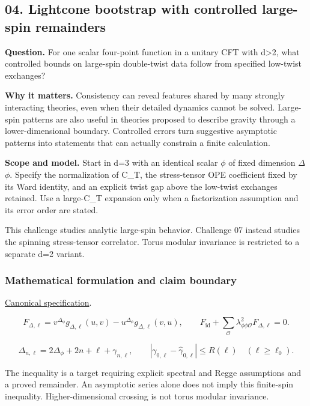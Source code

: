 \documentclass[
  11pt,
]{article}
\begin{document}
\subsection{04. Lightcone bootstrap with controlled large-spin
remainders}

\textbf{Question.} For one scalar four-point function in a unitary CFT
with d\textgreater2, what controlled bounds on large-spin double-twist
data follow from specified low-twist exchanges?

\textbf{Why it matters.} Consistency can reveal features shared by many
strongly interacting theories, even when their detailed dynamics cannot
be solved. Large-spin patterns are also useful in theories proposed to
describe gravity through a lower-dimensional boundary. Controlled errors
turn suggestive asymptotic patterns into statements that can actually
constrain a finite calculation.

\textbf{Scope and model.} Start in d=3 with an identical scalar
\ensuremath{\phi} of fixed dimension
\ensuremath{\Delta}\ensuremath{\phi}. Specify the normalization of C\_T,
the stress-tensor OPE coefficient fixed by its Ward identity, and an
explicit twist gap above the low-twist exchanges retained. Use a
large-C\_T expansion only when a factorization assumption and its error
order are stated.

This challenge studies analytic large-spin behavior. Challenge 07
instead studies the spinning stress-tensor correlator. Torus modular
invariance is restricted to a separate d=2 variant.

\subsubsection{Mathematical formulation and claim boundary}

\href{https://github.com/rick-stevens-ai/Pure-Thought/blob/main/PRDs/04-Modular-Lightcone-Bootstrap.md}{Canonical
specification}.

\[F_{\Delta,\ell}=v^{\Delta_\phi}g_{\Delta,\ell}(u,v)
-u^{\Delta_\phi}g_{\Delta,\ell}(v,u),\qquad
F_{\mathrm{id}}+\sum_{\mathcal O}\lambda_{\phi\phi\mathcal O}^{2}F_{\Delta,\ell}=0.\]

\[\Delta_{n,\ell}=2\Delta_\phi+2n+\ell+\gamma_{n,\ell},\qquad
|\gamma_{0,\ell}-\widehat\gamma_{0,\ell}|\le R(\ell)\quad(\ell\ge\ell_0).\]

The inequality is a target requiring explicit spectral and Regge
assumptions and a proved remainder. An asymptotic series alone does not
imply this finite-spin inequality. Higher-dimensional crossing is not
torus modular invariance.
\end{document}

